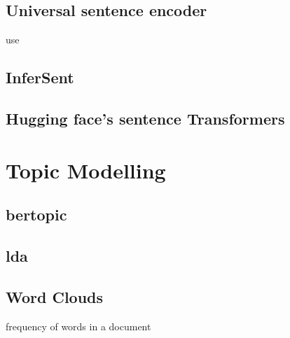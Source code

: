 \subsection{Universal sentence encoder}\label{subsec:univ-sent-encoder}
\ac{use}
\cite{UniversalSentEnc2018}

\subsection{InferSent}\label{subsec:inferSent}
\cite{inferSent2018}

\subsection{Hugging face's sentence Transformers}\label{subsec:hf-sent-ransformers}
\cite{HfsentTrans2019}







\section{Topic Modelling}\label{sec:topic-modelling}

\subsection{\ac{bertopic}}\label{subsec:bertopic}

\subsection{\ac{lda}}\label{subsec:latent-dirichlet-allocation}

\subsection{Word Clouds}\label{subsec:word-clouds}
frequency of words in a document


